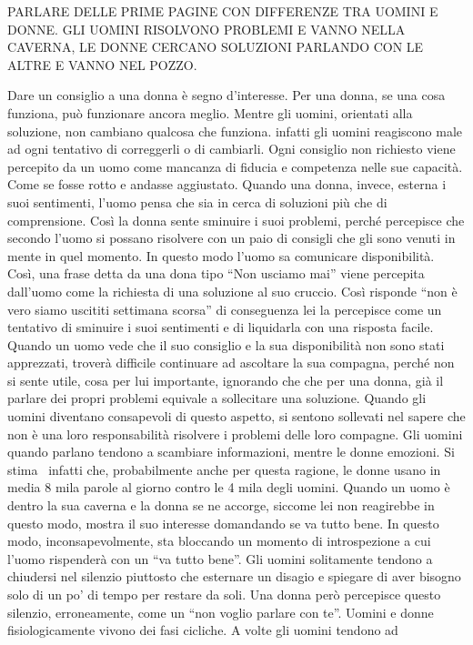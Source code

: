 \documentclass[12pt]{book} %
\begin{document}
PARLARE DELLE PRIME PAGINE CON DIFFERENZE TRA UOMINI E DONNE. GLI UOMINI RISOLVONO PROBLEMI E VANNO NELLA CAVERNA, LE
DONNE CERCANO SOLUZIONI PARLANDO CON LE ALTRE E VANNO NEL POZZO.

Dare un consiglio a una donna è segno d'interesse. Per una donna, se una cosa funziona, può
funzionare ancora meglio. Mentre gli uomini, orientati alla soluzione, non cambiano qualcosa che funziona. infatti gli
uomini reagiscono male ad ogni tentativo di correggerli o di cambiarli. Ogni consiglio non richiesto viene percepito da
un uomo come mancanza di fiducia e competenza nelle sue capacità. Come se fosse rotto e andasse aggiustato. Quando una
donna, invece, esterna i suoi sentimenti, l'uomo pensa che sia in cerca di soluzioni più che di
comprensione. Così la donna sente sminuire i suoi problemi, perché percepisce che secondo l'uomo
si possano risolvere con un paio di consigli che gli sono venuti in mente in quel momento. In questo modo
l'uomo sa comunicare disponibilità. Così, una frase detta da una dona tipo “Non usciamo mai” viene
percepita dall'uomo come la richiesta di una soluzione al suo cruccio. Così risponde “non è vero
siamo uscititi settimana scorsa” di conseguenza lei la percepisce come un tentativo di sminuire i suoi sentimenti e di
liquidarla con una risposta facile. Quando un uomo vede che il suo consiglio e la sua disponibilità non sono stati
apprezzati, troverà difficile continuare ad ascoltare la sua compagna, perché non si sente utile, cosa per lui
importante, ignorando che che per una donna, già il parlare dei propri problemi equivale a sollecitare una soluzione.
Quando gli uomini diventano consapevoli di questo aspetto, si sentono sollevati nel sapere che non è una loro
responsabilità risolvere i problemi delle loro compagne. Gli uomini quando parlano tendono a scambiare informazioni,
mentre le donne emozioni. Si stima \ infatti che, probabilmente anche per questa ragione, le donne usano in media 8
mila parole al giorno contro le 4 mila degli uomini. Quando un uomo è dentro la sua caverna e la donna se ne accorge,
siccome lei non reagirebbe in questo modo, mostra il suo interesse domandando se va tutto bene. In questo modo,
inconsapevolmente, sta bloccando un momento di introspezione a cui l'uomo rispenderà con un “va
tutto bene”. Gli uomini solitamente tendono a chiudersi nel silenzio piuttosto che esternare un disagio e spiegare di
aver bisogno solo di un po' di tempo per restare da soli. Una donna però percepisce questo silenzio, erroneamente, come
un “non voglio parlare con te”. Uomini e donne fisiologicamente vivono dei fasi cicliche. A volte gli uomini tendono ad
\end{document}
